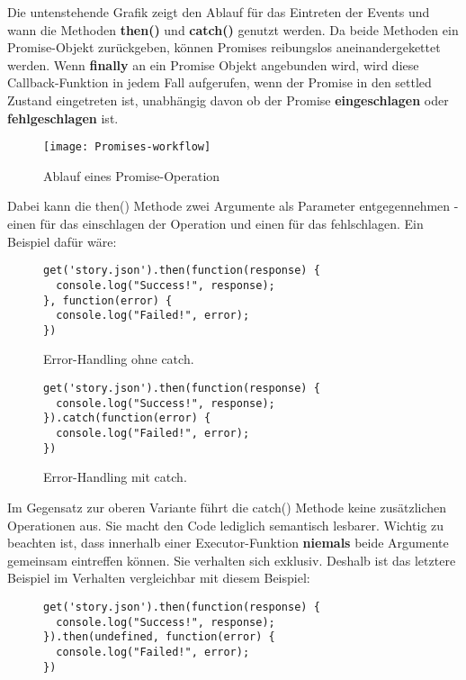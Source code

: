 \noindent
Die untenstehende Grafik zeigt den Ablauf für das Eintreten der Events und wann die Methoden \textbf{then()} und \textbf{catch()} genutzt werden. Da beide Methoden ein Promise-Objekt zurückgeben, können Promises reibungslos aneinandergekettet werden. Wenn \textbf{finally} an ein Promise Objekt angebunden wird, wird diese Callback-Funktion in jedem Fall aufgerufen, wenn der Promise in den settled Zustand eingetreten ist, unabhängig davon ob der Promise \textbf{eingeschlagen} oder \textbf{fehlgeschlagen} ist.


\begin{figure}[H]
\texttt{[image: Promises-workflow]}
\caption{Ablauf eines Promise-Operation \cite{promise-executor}}
\end{figure}

\noindent
Dabei kann die then() Methode zwei Argumente als Parameter entgegennehmen - einen für das einschlagen der Operation und einen für das fehlschlagen. Ein Beispiel dafür wäre:

\begin{figure}[H]
\begin{lstlisting}
get('story.json').then(function(response) {
  console.log("Success!", response);
}, function(error) {
  console.log("Failed!", error);
})
\end{lstlisting}
\caption{Error-Handling ohne catch. \cite{callback-vs-promises}}
\end{figure}

\begin{figure}[H]
\begin{lstlisting}
get('story.json').then(function(response) {
  console.log("Success!", response);
}).catch(function(error) {
  console.log("Failed!", error);
})
\end{lstlisting}
\caption{Error-Handling mit catch. \cite{callback-vs-promises}}
\end{figure}

\noindent
Im Gegensatz zur oberen Variante führt die catch() Methode keine zusätzlichen Operationen aus. Sie macht den Code lediglich semantisch lesbarer. Wichtig zu beachten ist, dass innerhalb einer Executor-Funktion \textbf{niemals} beide Argumente gemeinsam eintreffen können. Sie verhalten sich exklusiv. Deshalb ist das letztere Beispiel im Verhalten vergleichbar mit diesem Beispiel:

\begin{figure}[H]
\begin{lstlisting}
get('story.json').then(function(response) {
  console.log("Success!", response);
}).then(undefined, function(error) {
  console.log("Failed!", error);
})
\end{lstlisting}
\end{figure}

